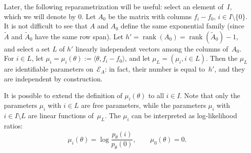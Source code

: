 \documentclass[aos,noinfoline]{imsart}
\DeclareMathOperator{\rank}{rank}
\newcommand{\Ecal}{\mathcal{E}}
\theoremstyle{remark}
\theoremstyle{definition}
\begin{document}
Later, the following reparametrization will be useful: select an element of~$I$, which we will denote by $0$.  Let
$A_{0}$ be the matrix with columns $f_{i}-f_{0}$, $i\in I\setminus\{0\}$.  It is not difficult to see that $A$ and
$A_{0}$ define the same exponential family (since $\tilde A$ and $\tilde A_{0}$ have the same row span).  Let
$h'=\rank(A_{0})=\rank(\tilde A_{0})-1$, and select a set $L$ of $h'$ linearly independent vectors among the columns
of~$A_{0}$.
For $i\in L$, let $\mu_{i}=\mu_{i}(\theta):=\langle\theta,f_{i}-f_{0}\rangle$, and let $\mu_{L}=(\mu_{i},i\in L)$.
Then the $\mu_{L}$ are identifiable parameters on~$\Ecal_{A}$: in fact, their number is equal
to~$h'$, and they are independent by construction.

It is possible to extend the definition of $\mu_{i}(\theta)$ to all $i\in I$.  Note that only the parameters $\mu_{i}$
with $i\in L$ are free parameters, while the parameters $\mu_{i}$ with $i\in I\setminus L$ are linear functions
of~$\mu_{L}$.
%
The $\mu_{i}$ can be interpreted as log-likelihood ratios:
\begin{equation*}
  \mu_{i}(\theta)=\log \frac{p_{\theta}(i)}{p_{\theta}(0)},
  \qquad
  \mu_{0}(\theta)=0.
\end{equation*}

\end{document}
